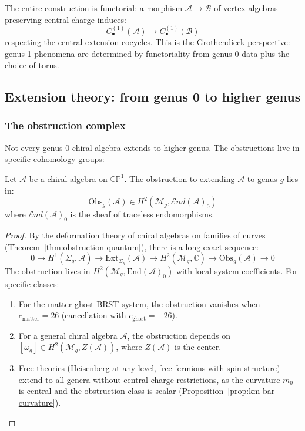 \begin{remark}[Functoriality]
The entire construction is functorial: a morphism $\mathcal{A} \to \mathcal{B}$
of vertex algebras preserving central charge induces:
\[C_{\bullet}^{(1)}(\mathcal{A}) \to C_{\bullet}^{(1)}(\mathcal{B})\]
respecting the central extension cocycles. This is the Grothendieck perspective:
genus 1 phenomena are determined by functoriality from genus 0 data plus the
choice of torus.
\end{remark}

\subsection{Extension theory: from genus 0 to higher genus}

\subsubsection{The obstruction complex}

Not every genus 0 chiral algebra extends to higher genus. The obstructions live in specific cohomology groups:

\begin{theorem}
\label{thm:extension-obstruction-bar}
Let $\mathcal{A}$ be a chiral algebra on $\mathbb{CP}^1$. The obstruction to extending $\mathcal{A}$ to genus $g$ lies in:
\[
\text{Obs}_g(\mathcal{A}) \in H^2(\overline{\mathcal{M}}_g, \mathcal{E}nd(\mathcal{A})_0)
\]
where $\mathcal{E}nd(\mathcal{A})_0$ is the sheaf of traceless endomorphisms.
\end{theorem}

\begin{proof}
By the deformation theory of chiral algebras on families of curves (Theorem~\ref{thm:obstruction-quantum}), there is a long exact sequence:
\[
0 \to H^1(\Sigma_g, \mathcal{A}) \to \text{Ext}_{\Sigma_g}(\mathcal{A}) \to H^2(\mathcal{M}_g, \mathbb{C}) \to \text{Obs}_g(\mathcal{A}) \to 0
\]
The obstruction lives in $H^2(\mathcal{M}_g, \mathrm{End}(\mathcal{A})_0)$ with local system coefficients. For specific classes:
\begin{enumerate}
\item For the matter-ghost BRST system, the obstruction vanishes when $c_{\text{matter}} = 26$ (cancellation with $c_{\text{ghost}} = -26$).
\item For a general chiral algebra $\mathcal{A}$, the obstruction depends on $[\omega_g] \in H^2(\mathcal{M}_g, Z(\mathcal{A}))$, where $Z(\mathcal{A})$ is the center.
\item Free theories (Heisenberg at any level, free fermions with spin structure) extend to all genera without central charge restrictions, as the curvature $m_0$ is central and the obstruction class is scalar (Proposition~\ref{prop:km-bar-curvature}).
\end{enumerate}
\end{proof}

